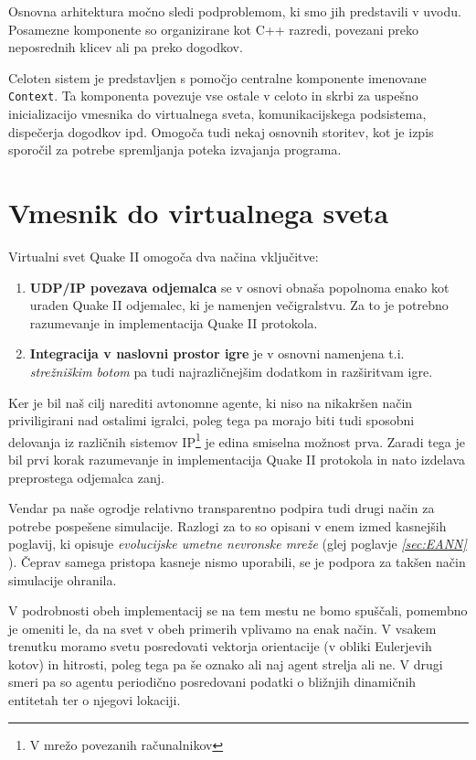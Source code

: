 \documentclass[a4paper,10pt]{article}
\begin{document}
Osnovna arhitektura močno sledi podproblemom, ki smo jih predstavili v uvodu. Posamezne komponente so organizirane kot C++ razredi, povezani preko neposrednih klicev ali pa preko dogodkov.

Celoten sistem je predstavljen s pomočjo centralne komponente imenovane \texttt{Context}. Ta komponenta povezuje vse ostale v celoto in skrbi za uspešno inicializacijo vmesnika do virtualnega sveta, komunikacijskega podsistema, dispečerja dogodkov ipd. Omogoča tudi nekaj osnovnih storitev, kot je izpis sporočil za potrebe spremljanja poteka izvajanja programa.

\section{Vmesnik do virtualnega sveta}

Virtualni svet Quake II omogoča dva načina vključitve:
\begin{enumerate}
  \item \textbf{UDP/IP povezava odjemalca} se v osnovi obnaša popolnoma enako kot uraden Quake II odjemalec, ki je namenjen večigralstvu. Za to je potrebno razumevanje in implementacija Quake II protokola.
  
  \item \textbf{Integracija v naslovni prostor igre} je v osnovni namenjena t.i. \textit{strežniškim botom} pa tudi najrazličnejšim dodatkom in razširitvam igre.
\end{enumerate}

Ker je bil naš cilj narediti avtonomne agente, ki niso na nikakršen način priviligirani nad ostalimi igralci, poleg tega pa morajo biti tudi sposobni delovanja iz različnih sistemov IP\footnote{V mrežo povezanih računalnikov} je edina smiselna možnost prva. Zaradi tega je bil prvi korak razumevanje in implementacija Quake II protokola in nato izdelava preprostega odjemalca zanj.

Vendar pa naše ogrodje relativno transparentno podpira tudi drugi način za potrebe pospešene simulacije. Razlogi za to so opisani v enem izmed kasnejših poglavij, ki opisuje \textit{evolucijske umetne nevronske mreže} (glej poglavje \textit{\ref{sec:EANN} }). Čeprav samega pristopa kasneje nismo uporabili, se je podpora za takšen način simulacije ohranila.

V podrobnosti obeh implementacij se na tem mestu ne bomo spuščali, pomembno je omeniti le, da na svet v obeh primerih vplivamo na enak način. V vsakem trenutku moramo svetu posredovati vektorja orientacije (v obliki Eulerjevih kotov) in hitrosti, poleg tega pa še oznako ali naj agent strelja ali ne. V drugi smeri pa so agentu periodično posredovani podatki o bližnjih dinamičnih entitetah ter o njegovi lokaciji.
\end{document}

